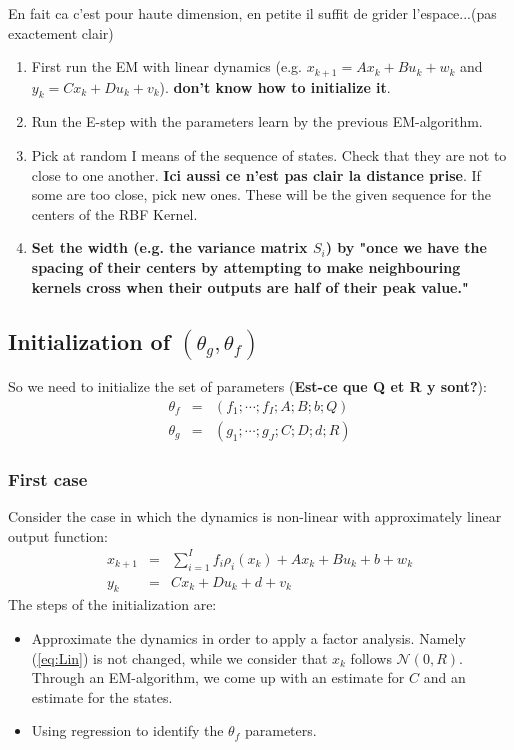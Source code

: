 En fait ca c'est pour haute dimension, en petite il suffit de grider l'espace...(pas exactement clair)
\begin{enumerate}
\item First run the EM with linear dynamics (e.g. $x_{k+1}=Ax_k+B u_k +w_k$ and $y_k=C x_k + D u_k +v_k$). \textbf{don't know how to initialize it}.
\item Run the E-step with the parameters learn by the previous EM-algorithm.
\item Pick at random I means of the sequence of states. Check that they are not to close to one another. \textbf{Ici aussi ce n'est pas clair la distance prise}. If some are too close, pick new ones. These will be the given sequence for the centers of the RBF Kernel.
\item \textbf{Set the width (e.g. the variance matrix $S_i$) by "once we have the spacing of their centers by attempting to make neighbouring kernels cross when their outputs are half of their peak value."}
\end{enumerate}

\subsection{Initialization of $(\theta_g,\theta_f)$}
So we need to initialize the set of parameters (\textbf{Est-ce que Q et R y sont?}):
\begin{eqnarray*}
\theta_f &=& (f_1;\cdots;f_{I};A;B;b;Q)\\
\theta_g &=& (g_1;\cdots;g_{J};C;D;d;R)
\end{eqnarray*}

\subsubsection{First case}
Consider the case in which the dynamics is non-linear with approximately linear output function:
\begin{eqnarray}
x_{k+1} &=& \sum_{i=1}^{I}{f_i\rho_i(x_k)}+Ax_k+Bu_k+b+w_k\\\label{eq:caca}
y_{k} &=& Cx_k+Du_k+d+v_k\label{eq:Lin}
\end{eqnarray}
The steps of the initialization are:
\begin{itemize}
\item Approximate the dynamics in order to apply a factor analysis. Namely (\ref{eq:Lin}) is not changed, while we consider that $x_k$ follows $\mathcal{N}(0,R)$. Through an EM-algorithm, we come up with an estimate for $C$ and an estimate for the states.
\item Using regression to identify the $\theta_f$ parameters.
\end{itemize}

